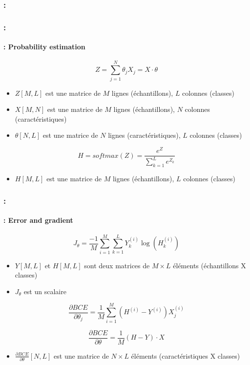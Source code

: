 \documentclass[xcolor=table]{beamer}
\begin{document}
\begin{frame}
	\frametitle{\insertshortsubtitle: \insertsection}
	\framesubtitle{\insertsubsection}
	
	
\end{frame}

\begin{frame}
	\frametitle{\insertshortsubtitle: \insertsection}
	\framesubtitle{\insertsubsection: Probability estimation}
	
	\[Z = \sum_{j=1}^{N} \theta_j X_j = X \cdot \theta\]
	\begin{itemize}
		\item $Z[M, L]$ est une matrice de $M$ lignes (échantillons), $L$ colonnes (classes)
		\item $X[M, N]$ est une matrice de $M$ lignes (échantillons), $N$ colonnes (caractéristiques)
		\item $\theta[N, L]$ est une matrice de $N$ lignes (caractéristiques), $L$ colonnes (classes)
	\end{itemize}
	
	\[H = softmax(Z) = \frac{e^{Z}}{\sum_{k=1}^{L} e^{Z_k}}\]
	
	\begin{itemize}
		\item $H[M, L]$ est une matrice de $M$ lignes (échantillons), $L$ colonnes (classes)
	\end{itemize}
	
\end{frame}

\begin{frame}
	\frametitle{\insertshortsubtitle: \insertsection}
	\framesubtitle{\insertsubsection: Error and gradient}
	
	\[J_\theta = \frac{-1}{M} \sum\limits_{i=1}^{M} \sum_{k=1}^{L} Y^{(i)}_k \log(H^{(i)}_k)\]
	\begin{itemize}
		\item $Y[M, L]$ et $H[M, L]$ sont deux matrices de $M\times L$ éléments (échantillons X classes)
		\item $J_\theta$ est un scalaire
	\end{itemize}
	
	
	\[
	\frac{\partial BCE}{\partial \theta_j} = \frac{1}{M} \sum\limits_{i=1}^{M} (H^{(i)} - Y^{(i)}) X_j^{(i)}
	\]
	
	\[
	\frac{\partial BCE}{\partial \theta} = \frac{1}{M} (H - Y) \cdot X
	\]
	
	\begin{itemize}
		\item $\frac{\partial BCE}{\partial \theta}[N, L]$ est une matrice de $N\times L$ éléments (caractéristiques X classes)
	\end{itemize}
	
\end{frame}
\end{document}
